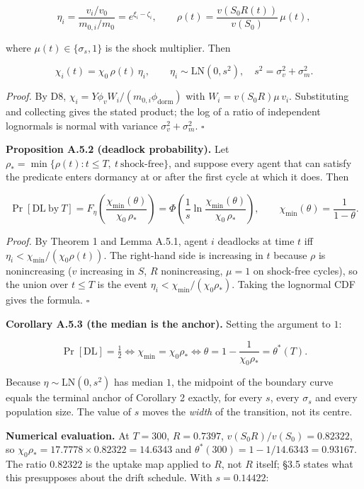 \documentclass[11pt,a4paper]{article}
\begin{document}
\[
\eta_i=\frac{v_i/v_0}{m_{0,i}/m_0}=e^{\xi_i-\zeta_i},
\qquad
\rho(t)=\frac{v(S_0R(t))}{v(S_0)}\,\mu(t),
\]

where \(\mu(t)\in\{\sigma_s,1\}\) is the shock multiplier. Then

\[
\chi_i(t)=\chi_0\,\rho(t)\,\eta_i,
\qquad \eta_i\sim\mathrm{LN}(0,s^2),\quad s^2=\sigma_v^2+\sigma_m^2 .
\]

\emph{Proof.} By D8, \(\chi_i=Y\phi_vW_i/(m_{0,i}\phi_{\mathrm{dorm}})\) with
\(W_i=v(S_0R)\mu\,v_i\). Substituting and collecting gives the stated product; the
log of a ratio of independent lognormals is normal with variance
\(\sigma_v^2+\sigma_m^2\). \(\square\)

\textbf{Proposition A.5.2 (deadlock probability).} Let \(\rho_\ast=\min\{\rho(t):
t\le T,\ t\ \text{shock-free}\}\), and suppose every agent that can satisfy the
predicate enters dormancy at or after the first cycle at which it does. Then

\[
\Pr[\mathrm{DL}\ \text{by}\ T]
=F_\eta\!\left(\frac{\chi_{\min}(\theta)}{\chi_0\,\rho_\ast}\right)
=\Phi\!\left(\frac{1}{s}\ln\frac{\chi_{\min}(\theta)}{\chi_0\,\rho_\ast}\right),
\qquad
\chi_{\min}(\theta)=\frac{1}{1-\theta}.
\]

\emph{Proof.} By Theorem 1 and Lemma A.5.1, agent \(i\) deadlocks at time \(t\) iff
\(\eta_i<\chi_{\min}/(\chi_0\rho(t))\). The right-hand side is increasing in \(t\)
because \(\rho\) is nonincreasing (\(v\) increasing in \(S\), \(R\) nonincreasing, \(\mu=1\)
on shock-free cycles), so the union over \(t\le T\) is the event
\(\eta_i<\chi_{\min}/(\chi_0\rho_\ast)\). Taking the lognormal CDF gives the
formula. \(\square\)

\textbf{Corollary A.5.3 (the median is the anchor).} Setting the argument to \(1\):

\[
\Pr[\mathrm{DL}]=\tfrac12
\iff
\chi_{\min}=\chi_0\rho_\ast
\iff
\theta=1-\frac{1}{\chi_0\rho_\ast}
=\theta^\ast(T).
\]

Because \(\eta\sim\mathrm{LN}(0,s^2)\) has median \(1\), the midpoint of the boundary
curve equals the terminal anchor of Corollary 2 exactly, for every \(s\), every
\(\sigma_s\) and every population size. The value of \(s\) moves the \emph{width} of the
transition, not its centre.

\textbf{Numerical evaluation.} At \(T=300\), \(R=0.7397\), \(v(S_0R)/v(S_0)=0.82322\), so
\(\chi_0\rho_\ast=17.7778\times0.82322=14.6343\) and
\(\theta^\ast(300)=1-1/14.6343=0.93167\). The ratio \(0.82322\) is the uptake map
applied to \(R\), not \(R\) itself; §3.5 states what this presupposes about the drift
schedule. With \(s=0.14422\):
\end{document}
